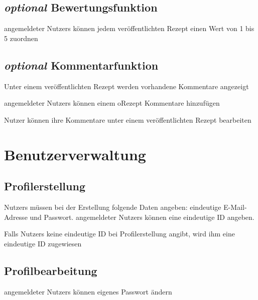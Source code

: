 	\subsection{{\em optional} Bewertungsfunktion}
		
		\Glspl{angemeldeter Nutzer} können jedem veröffentlichten Rezept einen Wert von 1 bis 5 zuordnen
		

	\subsection{{\em optional} Kommentarfunktion}

		Unter einem veröffentlichten Rezept werden vorhandene Kommentare angezeigt
	
	
		\Glspl{angemeldeter Nutzer} können einem \gls{oRezept} Kommentare hinzufügen
		
		Nutzer können ihre Kommentare unter einem veröffentlichten Rezept \gls{bearbeiten}
		
\section{Benutzerverwaltung}

	\subsection{Profilerstellung}
	
	\Glspl{Nutzer} müssen bei der Erstellung folgende Daten angeben: eindeutige E-Mail-Adresse und Passwort. \Glspl{angemeldeter Nutzer} können eine eindeutige \gls{ID} angeben. 
	
	Falls \Glspl{Nutzer} keine eindeutige \gls{ID} bei Profilerstellung angibt, wird ihm eine eindeutige \gls{ID} zugewiesen
	
		
	\subsection{Profilbearbeitung}
	
	\Glspl{angemeldeter Nutzer} können eigenes Passwort ändern
	
